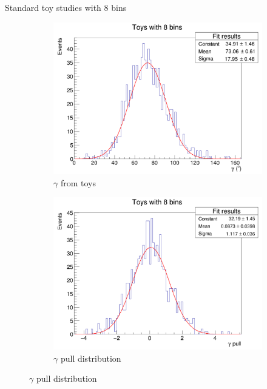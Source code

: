 \documentclass{beamer}
\begin{document}
\begin{frame}{Standard toy studies with $8$ bins}
  \begin{figure}
    \centering
    \vspace{-0.2cm}
    \begin{subfigure}{0.5\textwidth}
      \includegraphics[width = 1.0\textwidth]{Toy_Standard_8Bins.png}
      \caption{$\gamma$ from toys}
    \end{subfigure}%
    \begin{subfigure}{0.5\textwidth}
      \includegraphics[width = 1.0\textwidth]{Toy_Standard_8Bins_Pull.png}
      \caption{$\gamma$ pull distribution}
    \end{subfigure}
  \end{figure}
\end{frame}
\end{document}
